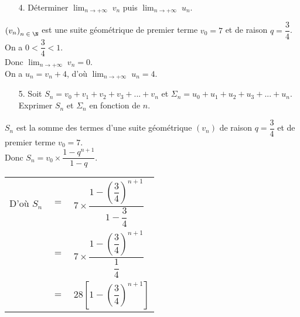 \newpage

\vspace*{-1cm}

\begin{itemize}
\item[4.] Déterminer $ \displaystyle {\lim_{n \rightarrow +\infty}} \; v_n$ puis $ \displaystyle {\lim_{n \rightarrow +\infty}} \; u_n$. \\
\end{itemize}

$\left(v_n\right)_{n \; \in \; \N}$ est une suite géométrique de premier terme $v_0 =7$ et de raison $q =\dfrac{3}{4}$. \\

On a $0 < \dfrac{3}{4} < 1$. \\

Donc $ \displaystyle {\lim_{n \rightarrow +\infty}} \; v_n = 0$. \\ 

On a $u_n = v_n + 4$, d'où $ \displaystyle {\lim_{n \rightarrow +\infty}} \; u_n = 4$. \\

\begin{itemize}
\item[5.] Soit $S_n = v_0 + v_1 + v_2 + v_3 + ... + v_n$ et $\Sigma_n = u_0 + u_1 + u_2 + u_3 + ... + u_n$. \\ Exprimer $S_n$ et $\Sigma_n$ en fonction de $n$. \\
\end{itemize}

$S_n$ est la somme des termes d'une suite géométrique $\left(v_n\right)$ de raison $q = \dfrac{3}{4}$ et de premier terme $v_0 = 7$. \\

Donc $S_n = v_0 \times \dfrac{1 - q^{n+1}}{1 - q}$. \\

\begin{tabular}{lll}
D'où $S_n$ & $=$ & $7 \times \dfrac{1 - \left(\dfrac{3}{4}\right)^{n+1}}{1 - \dfrac{3}{4}}$ \vspace*{.3cm} \\
& $=$ & $7 \times \dfrac{1 - \left(\dfrac{3}{4}\right)^{n+1}}{\dfrac{1}{4}}$ \vspace*{.3cm} \\
& $=$ & $28 \left[1 - \left(\dfrac{3}{4}\right)^{n+1}\right]$ \\
\end{tabular}

\vspace*{.3cm} 

